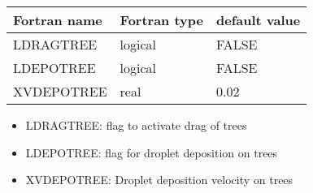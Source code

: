 \begin{center}
\begin{tabular} {|l|l|l|}
\hline
Fortran name & Fortran type & default value \\
\hline
LDRAGTREE   & logical  & FALSE  \\
LDEPOTREE   & logical  & FALSE  \\
XVDEPOTREE   & real  & 0.02  \\
\hline
\end{tabular}
\end{center}

\begin{itemize}

\item LDRAGTREE: flag to activate drag of trees
\item LDEPOTREE: flag for droplet deposition on trees
\item XVDEPOTREE: Droplet deposition velocity on trees
\end{itemize}
